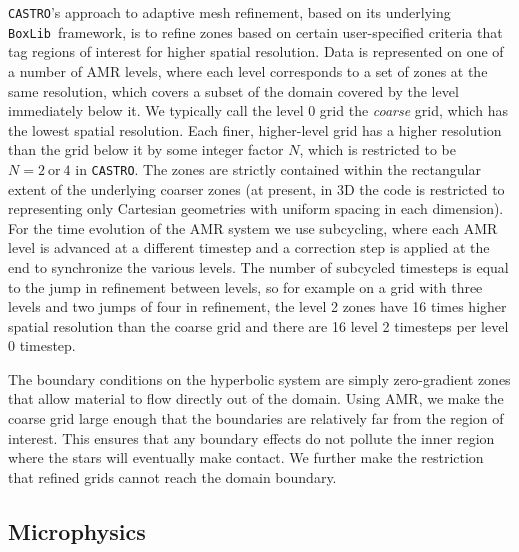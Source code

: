 \documentclass[iop,numberedappendix]{../emulateapj}
\newcommand{\boxlib}{\texttt{BoxLib}}
\newcommand{\castro}{\texttt{CASTRO}}
\begin{document}
\castro's approach to adaptive mesh refinement, based on its underlying
\boxlib\ framework, is to refine zones based on certain user-specified
criteria that tag regions of interest for higher spatial
resolution. Data is represented on one of a number of AMR levels,
where each level corresponds to a set of zones at the same resolution,
which covers a subset of the domain covered by the level immediately
below it. We typically call the level 0 grid the \textit{coarse} grid,
which has the lowest spatial resolution. Each finer, higher-level grid
has a higher resolution than the grid below it by some integer factor
$N$, which is restricted to be $N = 2\ \text{or}\ 4$ in \castro. The
zones are strictly contained within the rectangular extent of the
underlying coarser zones (at present, in 3D the code is restricted to representing
only Cartesian geometries with uniform spacing in each dimension). For the time
evolution of the AMR system we use subcycling, where each AMR level is
advanced at a different timestep and a correction step is applied at
the end to synchronize the various levels. The number of
subcycled timesteps is equal to the jump in refinement between levels,
so for example on a grid with three levels and two jumps of four in
refinement, the level 2 zones have 16 times higher spatial
resolution than the coarse grid and there are 16 level 2 timesteps
per level 0 timestep.

The boundary conditions on the hyperbolic system are simply
zero-gradient zones that allow material to flow directly out of the
domain. Using AMR, we make the coarse grid large enough that the
boundaries are relatively far from the region of interest. This
ensures that any boundary effects do not pollute the inner region
where the stars will eventually make contact.  We further make the
restriction that refined grids cannot reach the domain boundary.

\subsection{Microphysics}
\end{document}
